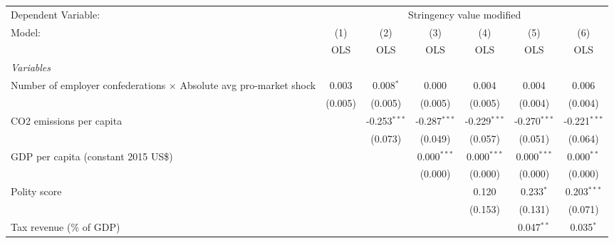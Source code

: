 
\begingroup
\centering
\begin{tabular}{lcccccc}
   \toprule
   Dependent Variable: & \multicolumn{6}{c}{Stringency value modified}\\
   Model:                                                                    & (1)     & (2)            & (3)            & (4)            & (5)            & (6)\\  
                                                                             &  OLS    & OLS            & OLS            & OLS            & OLS            & OLS\\  
   \midrule
   \emph{Variables}\\
   Number of employer confederations $\times$ Absolute avg pro-market shock  & 0.003   & 0.008$^{*}$    & 0.000          & 0.004          & 0.004          & 0.006\\   
                                                                             & (0.005) & (0.005)        & (0.005)        & (0.005)        & (0.004)        & (0.004)\\   
   CO2 emissions per capita                                                  &         & -0.253$^{***}$ & -0.287$^{***}$ & -0.229$^{***}$ & -0.270$^{***}$ & -0.221$^{***}$\\   
                                                                             &         & (0.073)        & (0.049)        & (0.057)        & (0.051)        & (0.064)\\   
   GDP per capita (constant 2015 US\$)                                       &         &                & 0.000$^{***}$  & 0.000$^{***}$  & 0.000$^{***}$  & 0.000$^{**}$\\   
                                                                             &         &                & (0.000)        & (0.000)        & (0.000)        & (0.000)\\   
   Polity score                                                              &         &                &                & 0.120          & 0.233$^{*}$    & 0.203$^{***}$\\   
                                                                             &         &                &                & (0.153)        & (0.131)        & (0.071)\\   
   Tax revenue (\% of GDP)                                                   &         &                &                &                & 0.047$^{**}$   & 0.035$^{*}$\\   

\end{tabular}
